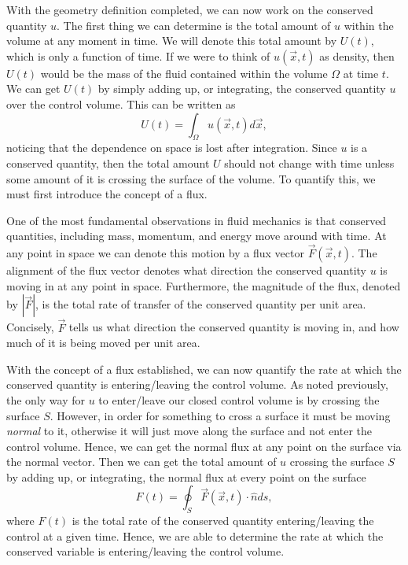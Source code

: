 With the geometry definition completed, we can now work on the conserved quantity $u$. The first thing we can determine is the total amount of $u$ within the volume at any moment in time. We will denote this total amount by $U(t)$, which is only a function of time. If we were to think of $u(\vec{x},t)$ as density, then $U(t)$ would be the mass of the fluid contained within the volume $\Omega$ at time $t$. We can get $U(t)$ by simply adding up, or integrating, the conserved quantity $u$ over the control volume. This can be written as
\begin{equation}
	\label{eqn:totalcons}
	U(t) = \int_\Omega u(\vec{x},t) d\vec{x},
\end{equation}
noticing that the dependence on space is lost after integration. Since $u$ is a conserved quantity, then the total amount $U$ should not change with time unless some amount of it is crossing the surface of the volume. To quantify this, we must first introduce the concept of a flux.

One of the most fundamental observations in fluid mechanics is that conserved quantities, including mass, momentum, and energy move around with time. At any point in space we can denote this motion by a flux vector $\vec{F}(\vec{x},t)$. The alignment of the flux vector denotes what direction the conserved quantity $u$ is moving in at any point in space. Furthermore, the magnitude of the flux, denoted by $|\vec{F}|$, is the total rate of transfer of the conserved quantity per unit area. Concisely, $\vec{F}$ tells us what direction the conserved quantity is moving in, and how much of it is being moved per unit area.

With the concept of a flux established, we can now quantify the rate at which the conserved quantity is entering/leaving the control volume. As noted previously, the only way for $u$ to enter/leave our closed control volume is by crossing the surface $S$. However, in order for something to cross a surface it must be moving {\it normal} to it, otherwise it will just move along the surface and not enter the control volume. Hence, we can get the normal flux at any point on the surface via the normal vector. Then we can get the total amount of $u$ crossing the surface $S$ by adding up, or integrating, the normal flux at every point on the surface
\begin{equation}
	\label{eqn:totalflux}
	F(t) = \oint_S \vec{F}(\vec{x},t) \cdot \hat{n} ds,
\end{equation}
where $F(t)$ is the total rate of the conserved quantity entering/leaving the control at a given time. Hence, we are able to determine the rate at which the conserved variable is entering/leaving the control volume.

